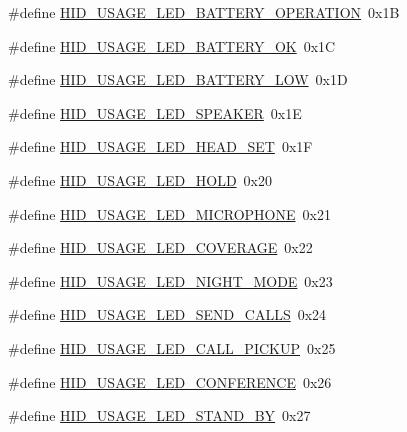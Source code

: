 \begin{DoxyCompactItemize}
\item 
\#define \hyperlink{group__USBD__HID_ga271a64b1cc255d53e0c8a6faaa839a9d}{H\-I\-D\-\_\-\-U\-S\-A\-G\-E\-\_\-\-L\-E\-D\-\_\-\-B\-A\-T\-T\-E\-R\-Y\-\_\-\-O\-P\-E\-R\-A\-T\-I\-O\-N}~0x1\-B
\item 
\#define \hyperlink{group__USBD__HID_gaf8763b6fea392885b88bb33268958830}{H\-I\-D\-\_\-\-U\-S\-A\-G\-E\-\_\-\-L\-E\-D\-\_\-\-B\-A\-T\-T\-E\-R\-Y\-\_\-\-O\-K}~0x1\-C
\item 
\#define \hyperlink{group__USBD__HID_ga48f4348d9621af4e15ea165120da03be}{H\-I\-D\-\_\-\-U\-S\-A\-G\-E\-\_\-\-L\-E\-D\-\_\-\-B\-A\-T\-T\-E\-R\-Y\-\_\-\-L\-O\-W}~0x1\-D
\item 
\#define \hyperlink{group__USBD__HID_ga8624c57f4679741495fa8d327071a019}{H\-I\-D\-\_\-\-U\-S\-A\-G\-E\-\_\-\-L\-E\-D\-\_\-\-S\-P\-E\-A\-K\-E\-R}~0x1\-E
\item 
\#define \hyperlink{group__USBD__HID_ga55628e40adac70d0ebf16913ff7fa8e4}{H\-I\-D\-\_\-\-U\-S\-A\-G\-E\-\_\-\-L\-E\-D\-\_\-\-H\-E\-A\-D\-\_\-\-S\-E\-T}~0x1\-F
\item 
\#define \hyperlink{group__USBD__HID_gaaf5fe8bc99060dfc70ed7961592591eb}{H\-I\-D\-\_\-\-U\-S\-A\-G\-E\-\_\-\-L\-E\-D\-\_\-\-H\-O\-L\-D}~0x20
\item 
\#define \hyperlink{group__USBD__HID_ga2875a5dab91a823cd139a9f1222fc411}{H\-I\-D\-\_\-\-U\-S\-A\-G\-E\-\_\-\-L\-E\-D\-\_\-\-M\-I\-C\-R\-O\-P\-H\-O\-N\-E}~0x21
\item 
\#define \hyperlink{group__USBD__HID_ga5b3c58fa1201bedf7768c49681dae586}{H\-I\-D\-\_\-\-U\-S\-A\-G\-E\-\_\-\-L\-E\-D\-\_\-\-C\-O\-V\-E\-R\-A\-G\-E}~0x22
\item 
\#define \hyperlink{group__USBD__HID_ga896fc5e9fef8c77f6bc9632d225a3172}{H\-I\-D\-\_\-\-U\-S\-A\-G\-E\-\_\-\-L\-E\-D\-\_\-\-N\-I\-G\-H\-T\-\_\-\-M\-O\-D\-E}~0x23
\item 
\#define \hyperlink{group__USBD__HID_ga54c05842cb29924ec44436bc1faa36c0}{H\-I\-D\-\_\-\-U\-S\-A\-G\-E\-\_\-\-L\-E\-D\-\_\-\-S\-E\-N\-D\-\_\-\-C\-A\-L\-L\-S}~0x24
\item 
\#define \hyperlink{group__USBD__HID_gaf351566a10977d6f73f001857f00b8be}{H\-I\-D\-\_\-\-U\-S\-A\-G\-E\-\_\-\-L\-E\-D\-\_\-\-C\-A\-L\-L\-\_\-\-P\-I\-C\-K\-U\-P}~0x25
\item 
\#define \hyperlink{group__USBD__HID_gaeca2c05d89704467b0a6a33055deafd6}{H\-I\-D\-\_\-\-U\-S\-A\-G\-E\-\_\-\-L\-E\-D\-\_\-\-C\-O\-N\-F\-E\-R\-E\-N\-C\-E}~0x26
\item 
\#define \hyperlink{group__USBD__HID_gad82fd57bc472dd30b47e712ca83647ce}{H\-I\-D\-\_\-\-U\-S\-A\-G\-E\-\_\-\-L\-E\-D\-\_\-\-S\-T\-A\-N\-D\-\_\-\-B\-Y}~0x27

\end{DoxyCompactItemize}
